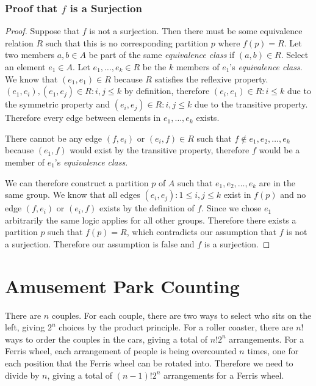 \documentclass[12pt]{article}
\begin{document}
\subsubsection*{Proof that $f$ is a Surjection}
\begin{proof}
Suppose that $f$ is not a surjection. Then there must be some equivalence relation $R$ such that this is no corresponding partition $p$ where $f(p) = R$. Let two members $a, b \in A$ be part of the same \emph{equivalence class} if $(a, b) \in R$. Select an element $e_1 \in A$. Let $e_1, \ldots, e_k \in R$ be the $k$ members of $e_1$'s \emph{equivalence class}. We know that $(e_1, e_1) \in R$ because $R$ satisfies the reflexive property. $(e_1, e_i), (e_1, e_j) \in R: i,j \leq k$ by definition, therefore $(e_i, e_1) \in R: i \leq k$ due to the symmetric property and $(e_i, e_j) \in R: i,j \leq k$ due to the transitive property. Therefore every edge between elements in $e_1, \ldots, e_k$ exists. 

There cannot be any edge $(f, e_i)$ or $(e_i, f) \in R$ such that $f \notin e_1, e_2, \ldots, e_k$ because $(e_1, f)$ would exist by the transitive property, therefore $f$ would be a member of $e_1$'s \emph{equivalence class}.

We can therefore construct a partition $p$ of $A$ such that $e_1, e_2, \ldots, e_k$ are in the same group. We know that all edges $(e_i, e_j): 1 \leq i, j \leq k$ exist in $f(p)$ and no edge $(f, e_i)$ or $(e_i, f)$ exists by the definition of $f$. Since we chose $e_1$ arbitrarily the same logic applies for all other groups. Therefore there exists a partition $p$ such that $f(p) = R$, which contradicts our assumption that $f$ is not a surjection. Therefore our assumption is false and $f$ is a surjection.
\end{proof}


\section{Amusement Park Counting}

There are $n$ couples. For each couple, there are two ways to select who sits on the left, giving $2^n$ choices by the product principle. For a roller coaster, there are $n!$ ways to order the couples in the cars, giving a total of $n!2^n$ arrangements. For a Ferris wheel, each arrangement of people is being overcounted $n$ times, one for each position that the Ferris wheel can be rotated into. Therefore we need to divide by $n$, giving a total of $(n-1)!2^n$ arrangements for a Ferris wheel.
\end{document}
